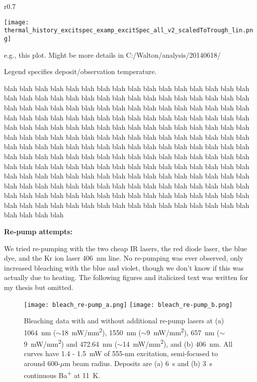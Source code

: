 \documentclass{article}
\begin{document}
\begin{wrapfigure}{r}{0.7\textwidth}
  \begin{center}
    \texttt{[image: thermal\_history\_excitspec\_examp\_excitSpec\_all\_v2\_scaledToTrough\_lin.png]}
  \end{center}
\end{wrapfigure}

e.g., this plot.  Might be more details in C:/Walton/analysis/20140618/

\vspace{3mm}

\noindent
Legend specifies deposit/observation temperature.

{\color{white}blah blah blah blah blah blah blah blah blah blah blah blah blah blah blah blah blah blah blah blah blah blah blah blah blah blah blah blah blah blah blah blah blah blah blah blah blah blah blah blah blah blah blah blah blah blah blah blah blah blah blah blah blah blah blah blah blah blah blah blah blah blah blah blah  blah blah blah blah blah blah blah blah blah blah blah blah blah blah blah blah blah blah blah blah blah blah blah blah blah blah blah blah blah blah blah blah blah blah blah blah blah blah blah blah blah blah blah blah blah blah blah blah blah blah blah blah blah blah blah blah blah blah blah blah blah blah blah blah blah blah blah blah blah blah blah blah blah blah blah blah blah blah blah blah blah blah blah blah blah blah blah blah blah blah blah blah blah blah blah blah blah blah blah blah blah blah blah blah blah blah  blah blah blah blah blah blah blah blah blah blah blah blah blah blah blah blah blah blah blah blah blah blah blah blah blah blah blah blah blah blah blah blah blah blah blah blah blah blah blah blah blah blah}


\noindent
\textbf{Re-pump attempts:}

We tried re-pumping with the two cheap IR lasers, the red diode laser, the blue dye, and the Kr ion laser 406~nm line.  No re-pumping was ever observed, only increased bleaching with the blue and violet, though we don't know if this was actually due to heating.  The following figures and italicized text was written for my thesis but omitted.

\begin{figure} [H]
        \centering
                \texttt{[image: bleach\_re-pump\_a.png]}
                \texttt{[image: bleach\_re-pump\_b.png]}
                \caption{Bleaching data with and without additional re-pump lasers at (a) 1064~nm ($\sim$18~mW/mm\textsuperscript{2}), 1550~nm ($\sim$9~mW/mm\textsuperscript{2}), 657~nm ($\sim$9~mW/mm\textsuperscript{2}) and 472.64~nm ($\sim$14~mW/mm\textsuperscript{2}), and (b) 406~nm.  All curves have 1.4 - 1.5~mW of 555-nm excitation, semi-focused to around 600-$\mu$m beam radius.  Deposits are (a) 6~s and (b) 3~s continuous Ba\textsuperscript{+} at 11~K.}
\end{figure}
\end{document}
